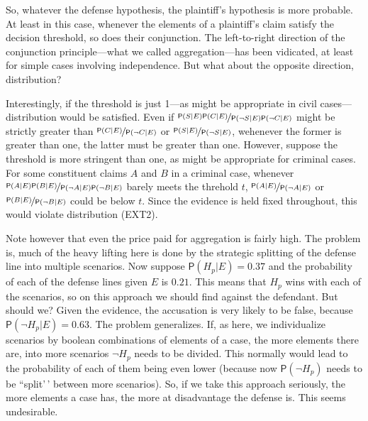 \documentclass[
  10pt,
  dvipsnames,enabledeprecatedfontcommands]{scrartcl}
\newcommand{\n}{\neg}
\newcommand{\pr}[1]{\mathsf{P}(#1)}
\begin{document}
\noindent So, whatever the defense hypothesis, the plaintiff's
hypothesis is more probable. At least in this case, whenever the
elements of a plaintiff's claim satisfy the decision threshold, so does
their conjunction. The left-to-right direction of the conjunction
principle---what we called aggregation---has been vidicated, at least
for simple cases involving independence. But what about the opposite
direction, distribution?

Interestingly, if the threshold is just 1---as might be appropriate in
civil cases---distribution would be satisfied. Even if
\(\nicefrac{\pr{S\vert E}\pr{C\vert E}}{\pr{\n S \vert E}\pr{\n C \vert E}}\)
might be strictly greater than
\(\nicefrac{\pr{C\vert E}}{\pr{\n C \vert E}}\) or
\(\nicefrac{\pr{S\vert E}}{\pr{\n S \vert E}}\), wehenever the former is
greater than one, the latter must be greater than
one. However, suppose the
threshold is more stringent than one, as might be appropriate for
criminal cases. For some constituent claims \(A\) and \(B\) in a
criminal case, whenever
\(\nicefrac{\pr{A\vert E}\pr{B\vert E}}{\pr{\n A \vert E}\pr{\n B \vert E}}\)
barely meets the threhold \(t\),
\(\nicefrac{\pr{A\vert E}}{\pr{\n A \vert E}}\) or
\(\nicefrac{\pr{B\vert E}}{\pr{\n B \vert E}}\) could be below \(t\).
Since the evidence is held fixed throughout, this would violate
distribution (EXT2).

Note however that even the price paid for aggregation is fairly high.
The problem is, much of the heavy lifting here is done by the strategic
splitting of the defense line into multiple scenarios. Now suppose
\(\pr{H_p\vert E}=0.37\) and the probability of each of the defense
lines given \(E\) is \(0.21\). This means that \(H_p\) wins with each of
the scenarios, so on this approach we should find against the defendant.
But should we? Given the evidence, the accusation is very likely to be
false, because \(\pr{\n H_p \vert E}=0.63\). The problem generalizes.
If, as here, we individualize scenarios by boolean combinations of
elements of a case, the more elements there are, into more scenarios
\(\n H_p\) needs to be divided. This normally would lead to the
probability of each of them being even lower (because now
\(\pr{\n H_p}\) needs to be ``split'\,' between more scenarios). So, if
we take this approach seriously, the more elements a case has, the more
at disadvantage the defense is. This seems undesirable.
\end{document}
